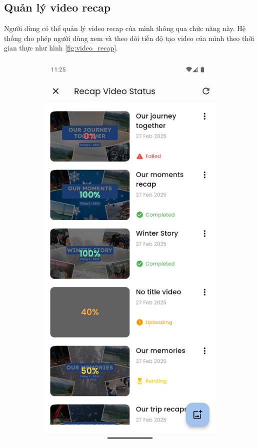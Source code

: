 \subsection{Quản lý video recap}

Người dùng có thể quản lý video recap của mình thông qua chức năng này. Hệ thống cho phép người dùng xem và theo dõi tiến độ tạo video của mình theo thời gian thực như hình \ref{fig:video_recap}.

\begin{figure}[H]
    \centering
    \begin{subfigure}{0.32\textwidth}
        \includegraphics[width=1\linewidth]{figures/c4/4-2/video_1.png} 

\end{subfigure}
\end{figure}
